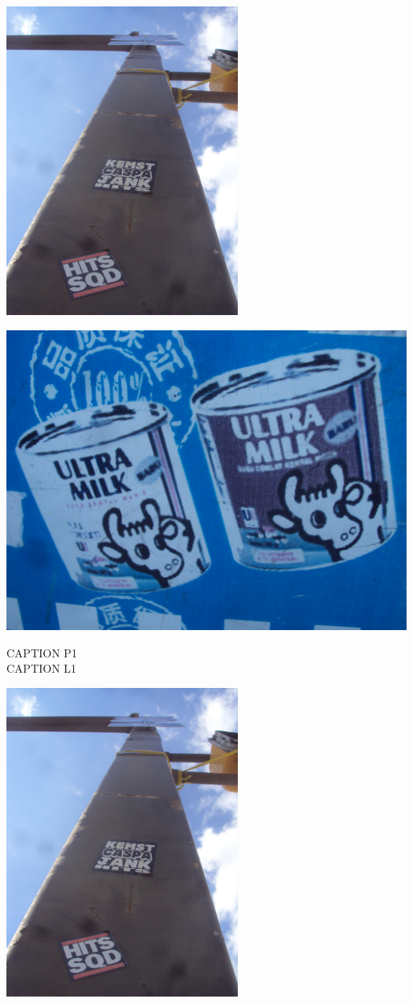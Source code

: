 \documentclass[10pt,letterpaper]{article}
\begin{document}
\includegraphics[height=4in]{portrait.jpg}

\vspace{0.25in}
\includegraphics[width=5.19in]{landscape.jpg}

CAPTION P1\\
CAPTION L1\\
\pagebreak

\includegraphics[height=4in]{portrait.jpg}
\end{document}
